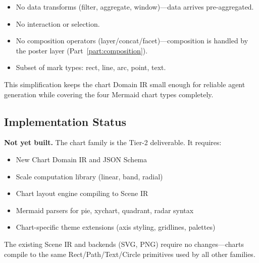\begin{itemize}
  \item No data transforms (filter, aggregate, window)---data arrives pre-aggregated.
  \item No interaction or selection.
  \item No composition operators (layer/concat/facet)---composition is handled by the
        poster layer (Part~\ref{part:composition}).
  \item Subset of mark types: rect, line, arc, point, text.
\end{itemize}

This simplification keeps the chart Domain IR small enough for reliable agent generation
while covering the four Mermaid chart types completely.

\subsection{Implementation Status}

\textbf{Not yet built.} The chart family is the Tier-2 deliverable. It requires:
\begin{itemize}
  \item New Chart Domain IR and JSON Schema
  \item Scale computation library (linear, band, radial)
  \item Chart layout engine compiling to Scene IR
  \item Mermaid parsers for pie, xychart, quadrant, radar syntax
  \item Chart-specific theme extensions (axis styling, gridlines, palettes)
\end{itemize}

The existing Scene IR and backends (SVG, PNG) require no changes---charts compile to the
same Rect/Path/Text/Circle primitives used by all other families.
